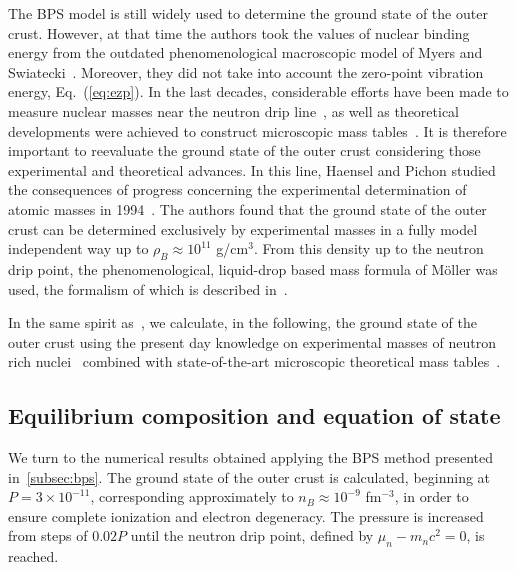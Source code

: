 The BPS model is still widely used to determine the ground state of the outer 
crust. However, at that time the authors took the values of nuclear binding 
energy from the outdated phenomenological macroscopic model of Myers and 
Swiatecki~\cite{Myers1965}. Moreover, they did not take
into account the zero-point vibration energy, Eq.~(\ref{eq:ezp}). In the last decades,
considerable efforts have been made to measure nuclear masses near the neutron
drip line~\cite{Lunney2003}, as well as theoretical developments were achieved 
to construct microscopic mass tables~\cite{Samyn2002}. It is therefore 
important to reevaluate the ground state of the outer crust considering those 
experimental and theoretical advances. In this line, Haensel and Pichon studied 
the consequences of progress concerning the experimental determination of atomic 
masses in 1994~\cite{Haensel1994}. The authors found that the ground state of
the outer crust can be determined exclusively by experimental masses in a fully
model independent way up to $\rho_B \approx 10^{11}$ g/cm$^3$. From this 
density up to the neutron drip point, the phenomenological, liquid-drop based 
mass formula of M\"oller was used, the formalism of which is described 
in~\cite{Moller1988}.

In the same spirit as~\cite{Haensel1994}, we calculate, in the following, the
ground state of the outer crust using the present day knowledge on experimental
masses of neutron rich nuclei~\cite{Huang2017,Welker2017} combined with 
state-of-the-art microscopic theoretical mass tables~\cite{Goriely2013}.

\subsection{Equilibrium composition and equation of state}\label{subsec:ocrust_compo}

We turn to the numerical results obtained applying the BPS method presented
in~\ref{subsec:bps}. The ground state of the outer crust is calculated,
beginning at $P = 3\times 10^{-11}$, corresponding approximately to 
$n_B \approx 10^{-9}$ fm$^{-3}$, in order to ensure complete ionization and 
electron degeneracy. The pressure is increased from steps of $0.02P$ until the 
neutron drip point, defined by $\mu_n - m_n c^2 = 0$, is reached.

